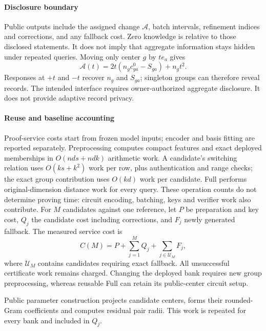 \paragraph{Disclosure boundary}
Public outputs include the assigned change $\mathcal A$, batch intervals,
refinement indices and corrections, and any fallback cost. Zero knowledge
is relative to those disclosed statements. It does not imply that aggregate
information stays hidden under repeated queries. Moving only center $g$ by
$t e_a$ gives
\begin{equation}
 \mathcal A(t)=2t(n_gc^0_{ga}-S_{ga})+n_gt^2.
 \label{eq:methodology-leakage}
\end{equation}
Responses at $+t$ and $-t$ recover $n_g$ and $S_{ga}$; singleton groups can
therefore reveal records. The intended interface requires owner-authorized
aggregate disclosure. It does not provide adaptive record privacy.

\paragraph{Reuse and baseline accounting}
Proof-service costs start from frozen model inputs; encoder and basis
fitting are reported separately.
Preprocessing computes compact features and exact deployed memberships in
$O(nds+ndk)$ arithmetic work. A candidate's switching relation uses
$O(ks+k^2)$ work per row, plus authentication and range checks; the exact
group contribution uses $O(kd)$ work per candidate. Full performs
original-dimension distance work for every query. These operation counts do
not determine proving time: circuit encoding, batching, keys and verifier
work also contribute. For $M$ candidates against one reference, let $P$ be
preparation and key cost, $Q_j$ the candidate cost including corrections, and
$F_j$ newly generated fallback. The measured service cost is
\begin{equation}
 C(M)=P+\sum_{j=1}^{M}Q_j+\sum_{j\in\mathcal U_M}F_j,
 \label{eq:methodology-cost}
\end{equation}
where $\mathcal U_M$ contains candidates requiring exact fallback. All
unsuccessful certificate work remains charged. Changing the deployed bank
requires new group preprocessing, whereas reusable Full can retain its
public-center circuit setup.

Public parameter construction projects candidate centers, forms their
rounded-Gram coefficients and computes residual pair radii. This work is
repeated for every bank and included in $Q_j$.

